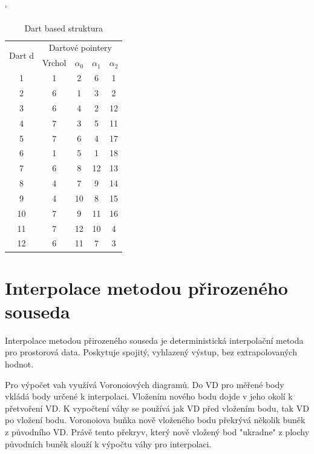 \documentclass[12pt,a4paper]{article}
\begin{document}
\begin{table}[h!]
\catcode`
\begin{tabular}{|c||c|c|c|c|}
\hline
\multirow{2}{*}{Dart d} & \multicolumn{4}{c|}{Dartové pointery} \\ \cline{2-5} 
                         & Vrchol &$\alpha_0$ & $\alpha_1$ & $\alpha_2$      \\ \hline
1                        & 1          & 2      & 6      & 1      \\ \hline
2                        & 6          & 1      & 3      & 2      \\ \hline
3                        & 6          & 4      & 2      & 12     \\ \hline
4                        & 7          & 3      & 5      & 11     \\ \hline
5                        & 7          & 6      & 4      & 17     \\ \hline
6                        & 1          & 5      & 1      & 18     \\ \hline
7                        & 6          & 8      & 12     & 13     \\ \hline
8                        & 4          & 7      & 9      & 14     \\ \hline
9                        & 4          & 10     & 8      & 15     \\ \hline
10                       & 7          & 9      & 11     & 16     \\ \hline
11                       & 7          & 12     & 10     & 4      \\ \hline
12                       & 6          & 11     & 7      & 3      \\ \hline
\end{tabular}
\caption{Dart based struktura}
\label{tab:dart_based}
\end{table}

\newpage
\section{Interpolace metodou přirozeného souseda}

Interpolace metodou přirozeného souseda je deterministická interpolační metoda pro prostorová data. Poskytuje spojitý, vyhlazený výstup, bez extrapolovaných hodnot. 

Pro výpočet vah využívá Voronoiových diagramů. Do VD pro měřené body vkládá body určené k interpolaci. Vložením nového bodu dojde v jeho okolí k přetvoření VD. K vypočtení váhy se používá jak VD před vložením bodu, tak VD po vložení bodu. Voronoiova buňka nově vloženého bodu překrývá několik buněk z původního VD. Právě tento překryv, který nově vložený bod "ukradne" z plochy původních buněk slouží k výpočtu váhy pro interpolaci.
\end{document}

